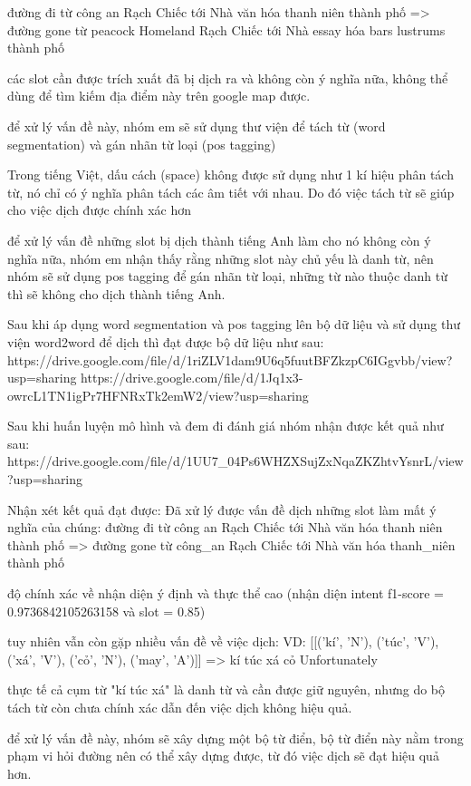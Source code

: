 đường đi từ công an Rạch Chiếc tới Nhà văn hóa thanh niên thành phố => đường gone từ peacock Homeland Rạch Chiếc tới Nhà essay hóa bars lustrums thành phố

các slot cần được trích xuất đã bị dịch ra và không còn ý nghĩa nữa, không thể dùng để tìm kiếm địa điểm này trên google map được.

để xử lý vấn đề này, nhóm em sẽ sử dụng thư viện để tách từ (word segmentation) và gán nhãn từ loại (pos tagging)

Trong tiếng Việt, dấu cách (space) không được sử dụng như 1 kí hiệu phân tách từ, nó chỉ có ý nghĩa phân tách các âm tiết với nhau. Do đó việc tách từ sẽ giúp cho việc dịch được chính xác hơn

để xử lý vấn đề những slot bị dịch thành tiếng Anh làm cho nó không còn ý nghĩa nữa, nhóm em nhận thấy rằng những slot này chủ yếu là danh từ, nên nhóm sẽ sử dụng pos tagging để gán nhãn từ loại, những từ nào thuộc danh từ thì sẽ không cho dịch thành tiếng Anh.

Sau khi áp dụng word segmentation và pos tagging lên bộ dữ liệu và sử dụng thư viện word2word để dịch thì đạt được bộ dữ liệu như sau:
https://drive.google.com/file/d/1riZLV1dam9U6q5fuutBFZkzpC6IGgvbb/view?usp=sharing
https://drive.google.com/file/d/1Jq1x3-owrcL1TN1igPr7HFNRxTk2emW2/view?usp=sharing

Sau khi huấn luyện mô hình và đem đi đánh giá nhóm nhận được kết quả như sau:
https://drive.google.com/file/d/1UU7_04Ps6WHZXSujZxNqaZKZhtvYsnrL/view?usp=sharing

Nhận xét kết quả đạt được: 
Đã xử lý được vấn đề dịch những slot làm mất ý nghĩa của chúng:
	đường đi từ công an Rạch Chiếc tới Nhà văn hóa thanh niên thành phố  =>
	đường gone từ công_an Rạch Chiếc tới Nhà văn hóa thanh_niên thành phố
	
độ chính xác về nhận diện ý định và thực thể cao (nhận diện intent f1-score = 0.9736842105263158 và slot = 0.85)

tuy nhiên vẫn còn gặp nhiều vấn đề về việc dịch: 
VD: [[('kí', 'N'), ('túc', 'V'), ('xá', 'V'), ('cỏ', 'N'), ('may', 'A')]]
 => kí túc xá cỏ Unfortunately
 
thực tế cả cụm từ "kí túc xá" là danh từ và cần được giữ nguyên, nhưng do bộ tách từ còn chưa chính xác dẫn đến việc dịch không hiệu quả.


để xử lý vấn đề này, nhóm sẽ xây dựng một bộ từ điển, bộ từ điển này nằm trong phạm vi hỏi đường nên có thể xây dựng được, từ đó việc dịch sẽ đạt hiệu quả hơn.

